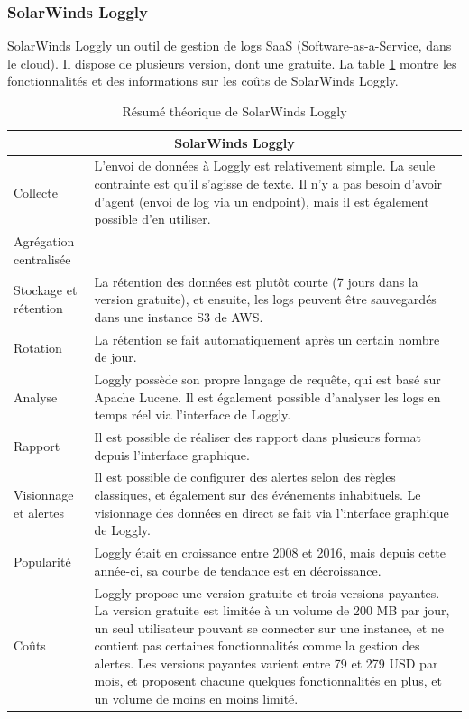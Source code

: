 \documentclass[paper=a4, fontsize=11pt]{scrartcl}
\begin{document}
\justify

\subsubsection{SolarWinds Loggly}
SolarWinds Loggly un outil de gestion de logs SaaS (Software-as-a-Service, dans le cloud). Il dispose de plusieurs version, dont une gratuite. La table \ref{t-resumeLoggly} montre les fonctionnalités et des informations sur les coûts de SolarWinds Loggly.

\centering
\begin{table}[H]
\begin{tabular}{ |p{4cm}||p{12cm}|  }
    \hline
    \multicolumn{2}{|c|}{SolarWinds Loggly} \\
    \hline
    Collecte & L'envoi de données à Loggly est relativement simple. La seule contrainte est qu'il s'agisse de texte. Il n'y a pas besoin d'avoir d'agent (envoi de log via un endpoint), mais il est également possible d'en utiliser.\\
    \hline
    Agrégation centralisée & \\
    \hline
    Stockage et rétention & La rétention des données est plutôt courte (7 jours dans la version gratuite), et ensuite, les logs peuvent être sauvegardés dans une instance S3 de AWS.\\
    \hline
    Rotation & La rétention se fait automatiquement après un certain nombre de jour.\\
    \hline
    Analyse & Loggly possède son propre langage de requête, qui est basé sur Apache Lucene. Il est également possible d'analyser les logs en temps réel via l'interface de Loggly.\\
    \hline
    Rapport & Il est possible de réaliser des rapport dans plusieurs format depuis l'interface graphique.\\
    \hline
    Visionnage et alertes & Il est possible de configurer des alertes selon des règles classiques, et également sur des événements inhabituels. Le visionnage des données en direct se fait via l'interface graphique de Loggly.\\
    \hline
    Popularité & Loggly était en croissance entre 2008 et 2016, mais depuis cette année-ci, sa courbe de tendance est en décroissance.\\
    \hline
    Coûts & Loggly propose une version gratuite et trois versions payantes. La version gratuite est limitée à un volume de 200 MB par jour, un seul utilisateur pouvant se connecter sur une instance, et ne contient pas certaines fonctionnalités comme la gestion des alertes. Les versions payantes varient entre 79 et 279 USD par mois, et proposent chacune quelques fonctionnalités en plus, et un volume de moins en moins limité.\\
    \hline
\end{tabular}
\caption{Résumé théorique de SolarWinds Loggly}
\label{t-resumeLoggly}
\end{table}
\end{document}
